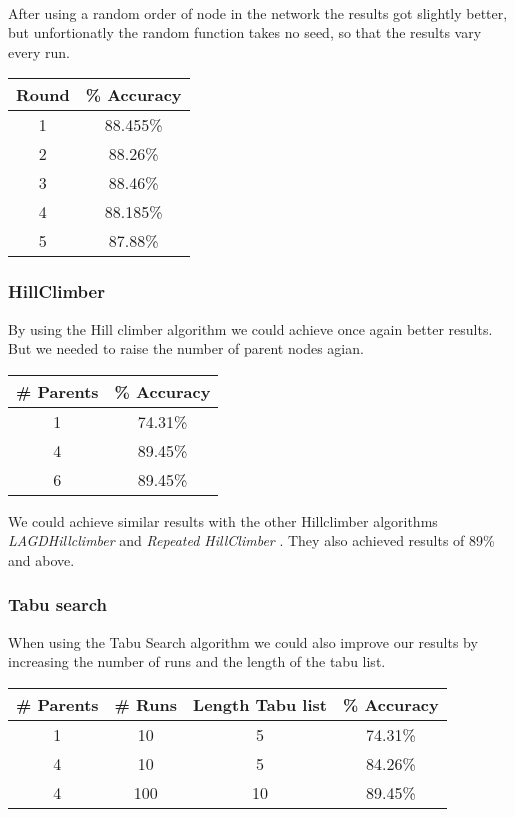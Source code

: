 \documentclass{article}
\begin{document}
\paragraph{}After using a random order of node in the network the results got slightly better, but unfortionatly the random function takes no seed, so that the results vary every run.

\begin{center}
\begin{tabular}{ c | c }
\textbf{Round} & \textbf{\% Accuracy} \\
\hline
1  & 88.455\% \\
2  & 88.26\% \\
3  & 88.46\% \\
4  & 88.185\% \\
5  & 87.88\% \\
\end{tabular}
\end{center}

\subsubsection{HillClimber}
By using the Hill climber algorithm we could achieve once again better results. But we needed to raise the number of parent nodes agian.
\begin{center}
\begin{tabular}{ c | c }
\textbf{\# Parents} & \textbf{\% Accuracy} \\
\hline
1  & 74.31\% \\
4  & 89.45\% \\
6  & 89.45\% \\
\end{tabular}
\end{center}

We could achieve similar results with the other Hillclimber algorithms \emph{LAGDHillclimber} and \emph{Repeated HillClimber} . They also achieved results of 89\% and above.

\subsubsection{Tabu search}
When using the Tabu Search algorithm we could also improve our results by increasing the number of runs and the length of the tabu list.
\begin{center}
\begin{tabular}{ c | c  | c | c }
\textbf{\# Parents} & \textbf{\# Runs} & \textbf{Length Tabu list}  & \textbf{\% Accuracy} \\
\hline
1  & 10 & 5 & 74.31\% \\
4  & 10 & 5 & 84.26\% \\
4  & 100 & 10&  89.45\% \\
\end{tabular}
\end{center}
\end{document}
